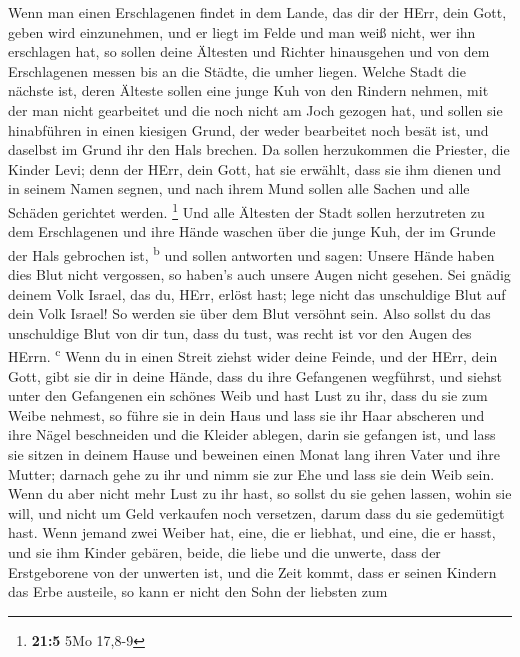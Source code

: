  Wenn man einen Erschlagenen findet in dem Lande, das dir
der HErr, dein Gott, geben wird einzunehmen, und er liegt im Felde und
man weiß nicht, wer ihn erschlagen hat,  so sollen deine
Ältesten und Richter hinausgehen und von dem Erschlagenen messen bis an
die Städte, die umher liegen.  Welche Stadt die nächste
ist, deren Älteste sollen eine junge Kuh von den Rindern nehmen, mit der
man nicht gearbeitet und die noch nicht am Joch gezogen hat,
 und sollen sie hinabführen in einen kiesigen Grund, der
weder bearbeitet noch besät ist, und daselbst im Grund ihr den Hals
brechen.  Da sollen herzukommen die Priester, die Kinder
Levi; denn der HErr, dein Gott, hat sie erwählt, dass sie ihm dienen und
in seinem Namen segnen, und nach ihrem Mund sollen alle Sachen und alle
Schäden gerichtet werden. \footnote{\textbf{21:5} 5Mo 17,8-9}
 Und alle Ältesten der Stadt sollen herzutreten zu dem
Erschlagenen und ihre Hände waschen über die junge Kuh, der im Grunde
der Hals gebrochen ist, \textsuperscript{b}  und sollen
antworten und sagen: Unsere Hände haben dies Blut nicht vergossen, so
haben's auch unsere Augen nicht gesehen.  Sei gnädig
deinem Volk Israel, das du, HErr, erlöst hast; lege nicht das
unschuldige Blut auf dein Volk Israel! So werden sie über dem Blut
versöhnt sein.  Also sollst du das unschuldige Blut von
dir tun, dass du tust, was recht ist vor den Augen des HErrn.
\textsuperscript{c}  Wenn du in einen Streit ziehst wider
deine Feinde, und der HErr, dein Gott, gibt sie dir in deine Hände, dass
du ihre Gefangenen wegführst,  und siehst unter den
Gefangenen ein schönes Weib und hast Lust zu ihr, dass du sie zum Weibe
nehmest,  so führe sie in dein Haus und lass sie ihr Haar
abscheren und ihre Nägel beschneiden  und die Kleider
ablegen, darin sie gefangen ist, und lass sie sitzen in deinem Hause und
beweinen einen Monat lang ihren Vater und ihre Mutter; darnach gehe zu
ihr und nimm sie zur Ehe und lass sie dein Weib sein. 
Wenn du aber nicht mehr Lust zu ihr hast, so sollst du sie gehen lassen,
wohin sie will, und nicht um Geld verkaufen noch versetzen, darum dass
du sie gedemütigt hast.  Wenn jemand zwei Weiber hat,
eine, die er liebhat, und eine, die er hasst, und sie ihm Kinder
gebären, beide, die liebe und die unwerte, dass der Erstgeborene von der
unwerten ist,  und die Zeit kommt, dass er seinen Kindern
das Erbe austeile, so kann er nicht den Sohn der liebsten zum
